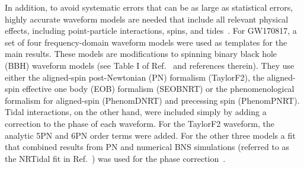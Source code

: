 \documentclass[prd,aps,letter,twocolumn,floatfix,notitlepage,nofootinbib]{revtex4-1}
\newcommand{\red}[1]{\textcolor{red}{#1}}
\begin{document}

In addition, to avoid systematic errors that can be as large as statistical errors, highly accurate waveform models are needed that include all relevant physical effects, including point-particle interactions, spins, and tides~\cite{Favata2014, YagiYunes2014, WadeCreightonOchsner2014}. For GW170817, a set of four frequency-domain waveform models were used as templates for the main results. These models are modifications to spinning binary black hole (BBH) waveform models (see Table I of Ref.~\cite{BNSPE} and references therein). They use either the aligned-spin post-Newtonian (PN) formalism (TaylorF2), the aligned-spin effective one body (EOB) formalism (SEOBNRT) or the phenomenological formalism for aligned-spin (PhenomDNRT) and precessing spin (PhenomPNRT). Tidal interactions, on the other hand, were included simply by adding a correction to the phase of each waveform. For the TaylorF2 waveform, the analytic 5PN and 6PN order terms were added. For the other three models a fit that combined results from PN and numerical BNS simulations (referred to as the NRTidal fit in Ref.~\cite{BNSPE}) was used for the phase correction~\cite{DietrichBernuzziTichy2017}.

\end{document}
